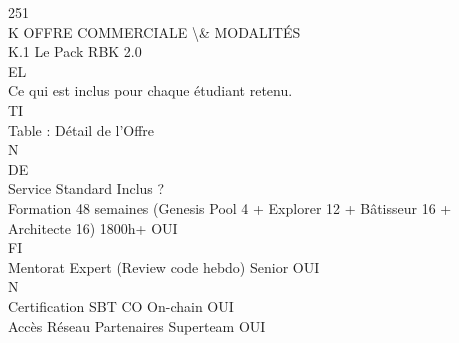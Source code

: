 \vspace{0.5em}
\vspace{0.5em}
\vspace{0.5em}
\vspace{0.5em}
251\\
K \textbar{} OFFRE COMMERCIALE \textbackslash{}& MODALITÉS\\
\vspace{0.5em}
\vspace{0.5em}
K.1 Le Pack RBK 2.0\\
\vspace{0.5em}
\vspace{0.5em}
\vspace{0.5em}
\vspace{0.5em}
EL\\
Ce qui est inclus pour chaque étudiant retenu.\\
\vspace{0.5em}
\vspace{0.5em}
\vspace{0.5em}
\vspace{0.5em}
TI\\
Table : Détail de l’Offre\\
\vspace{0.5em}
\vspace{0.5em}
\vspace{0.5em}
\vspace{0.5em}
N\\
DE\\
Service                                                                             Standard Inclus ?\\
Formation 48 semaines (Genesis Pool 4 + Explorer 12 + Bâtisseur 16 + Architecte 16) 1800h+ OUI\\
\vspace{0.5em}
\vspace{0.5em}
\vspace{0.5em}
\vspace{0.5em}
FI\\
Mentorat Expert (Review code hebdo)                                                 Senior    OUI\\
\vspace{0.5em}
\vspace{0.5em}
\vspace{0.5em}
N\\
Certification SBT                  CO                                               On-chain OUI\\
Accès Réseau Partenaires                                                            Superteam OUI\\

